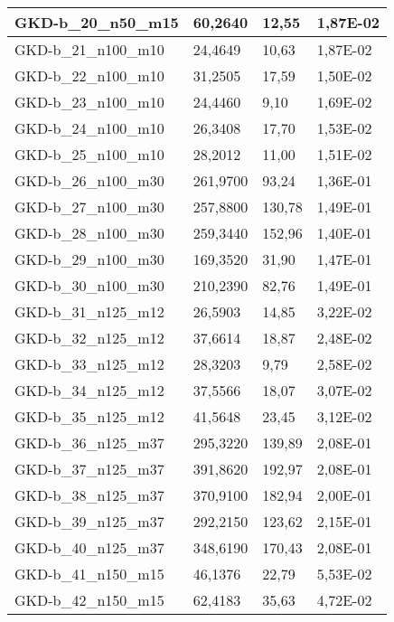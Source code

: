 \begin{table}[!ht]
\begin{adjustbox}{height=12cm}
\begin{tabular}{|l|l|l|l|}
        GKD-b\_20\_n50\_m15  & 60,2640  & 12,55         & 1,87E-02 \\ \hline
        GKD-b\_21\_n100\_m10 & 24,4649  & 10,63         & 1,87E-02 \\ \hline
        GKD-b\_22\_n100\_m10 & 31,2505  & 17,59         & 1,50E-02 \\ \hline
        GKD-b\_23\_n100\_m10 & 24,4460  & 9,10          & 1,69E-02 \\ \hline
        GKD-b\_24\_n100\_m10 & 26,3408  & 17,70         & 1,53E-02 \\ \hline
        GKD-b\_25\_n100\_m10 & 28,2012  & 11,00         & 1,51E-02 \\ \hline
        GKD-b\_26\_n100\_m30 & 261,9700 & 93,24         & 1,36E-01 \\ \hline
        GKD-b\_27\_n100\_m30 & 257,8800 & 130,78        & 1,49E-01 \\ \hline
        GKD-b\_28\_n100\_m30 & 259,3440 & 152,96        & 1,40E-01 \\ \hline
        GKD-b\_29\_n100\_m30 & 169,3520 & 31,90         & 1,47E-01 \\ \hline
        GKD-b\_30\_n100\_m30 & 210,2390 & 82,76         & 1,49E-01 \\ \hline
        GKD-b\_31\_n125\_m12 & 26,5903  & 14,85         & 3,22E-02 \\ \hline
        GKD-b\_32\_n125\_m12 & 37,6614  & 18,87         & 2,48E-02 \\ \hline
        GKD-b\_33\_n125\_m12 & 28,3203  & 9,79          & 2,58E-02 \\ \hline
        GKD-b\_34\_n125\_m12 & 37,5566  & 18,07         & 3,07E-02 \\ \hline
        GKD-b\_35\_n125\_m12 & 41,5648  & 23,45         & 3,12E-02 \\ \hline
        GKD-b\_36\_n125\_m37 & 295,3220 & 139,89        & 2,08E-01 \\ \hline
        GKD-b\_37\_n125\_m37 & 391,8620 & 192,97        & 2,08E-01 \\ \hline
        GKD-b\_38\_n125\_m37 & 370,9100 & 182,94        & 2,00E-01 \\ \hline
        GKD-b\_39\_n125\_m37 & 292,2150 & 123,62        & 2,15E-01 \\ \hline
        GKD-b\_40\_n125\_m37 & 348,6190 & 170,43        & 2,08E-01 \\ \hline
        GKD-b\_41\_n150\_m15 & 46,1376  & 22,79         & 5,53E-02 \\ \hline
        GKD-b\_42\_n150\_m15 & 62,4183  & 35,63         & 4,72E-02 \\ \hline

\end{tabular}
\end{adjustbox}
\end{table}
